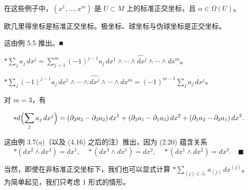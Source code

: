 \begin{example}

在这些例子中，$ (x^{1},\ldots,x^{m}) $ 是 $ U \subset M $ 上的标准正交坐标，且 $ \alpha \in \Omega(U) $。

\begin{items}
\item

欧几里得坐标是标准正交坐标。极坐标、球坐标与伪球坐标是正交坐标。

\proofhead
这由例 5.5 推出。\nobreak\hspace{0.35em}■
\item

$ \ast\sum_{j} a_{j}\,dx^{j} = \sum_{j=1}^{m}(-1)^{j-1}a_{j}\,dx^{1} \wedge \cdots \wedge \widehat{dx^{j}} \wedge \cdots \wedge dx^{m} $。

\item

$ \ast\sum_{j}(-1)^{j-1}a_{j}\,dx^{1} \wedge \cdots \wedge \widehat{dx^{j}} \wedge \cdots \wedge dx^{m} = (-1)^{m-1}\sum_{j}a_{j}\,dx^{j} $。

\item

对 $ m = 3 $，有

\[
\ast d\Bigl(\sum_{j} a_{j}\,dx^{j}\Bigr) = (\partial_{2}a_{3} - \partial_{3}a_{2})\,dx^{1} + (\partial_{3}a_{1} - \partial_{1}a_{3})\,dx^{2} + (\partial_{1}a_{2} - \partial_{2}a_{1})\,dx^{3} .
\]

\proofhead
这由例 3.7(a)（以及 (4.16) 之后的注）推出，因为 (2.20) 蕴含关系
\[
\ast(dx^{2} \wedge dx^{3}) = dx^{1} , \quad \ast(dx^{3} \wedge dx^{1}) = dx^{2} , \quad \ast(dx^{1} \wedge dx^{2}) = dx^{3} .\quad\blacksquare
\]

当然，即使在非标准正交坐标下，我们也可以显式计算 $ \ast\sum_{(j)\in\mathbb{J}_{r}}a_{(j)}\,dx^{(j)} $。为简单起见，我们只考虑 1 形式的情形。

\end{items}

\end{example}

